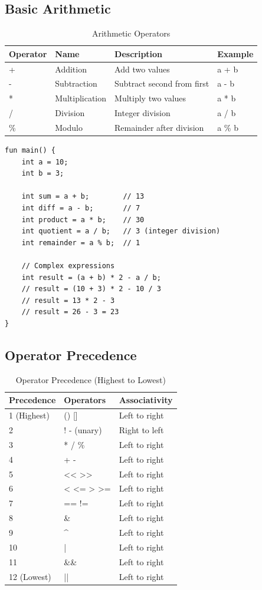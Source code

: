 \documentclass[12pt,a4paper,oneside]{book}
\begin{document}
\subsection{Basic Arithmetic}

\begin{table}[H]
\centering
\caption{Arithmetic Operators}
\begin{tabularx}{\textwidth}{|l|l|X|l|}
\hline
\textbf{Operator} & \textbf{Name} & \textbf{Description} & \textbf{Example} \\
\hline
+ & Addition & Add two values & a + b \\
- & Subtraction & Subtract second from first & a - b \\
* & Multiplication & Multiply two values & a * b \\
/ & Division & Integer division & a / b \\
\% & Modulo & Remainder after division & a \% b \\
\hline
\end{tabularx}
\end{table}

\begin{lstlisting}[style=algo, caption={Arithmetic Examples}]
fun main() {
    int a = 10;
    int b = 3;
    
    int sum = a + b;        // 13
    int diff = a - b;       // 7
    int product = a * b;    // 30
    int quotient = a / b;   // 3 (integer division)
    int remainder = a % b;  // 1
    
    // Complex expressions
    int result = (a + b) * 2 - a / b;
    // result = (10 + 3) * 2 - 10 / 3
    // result = 13 * 2 - 3
    // result = 26 - 3 = 23
}
\end{lstlisting}

\subsection{Operator Precedence}

\begin{table}[H]
\centering
\caption{Operator Precedence (Highest to Lowest)}
\begin{tabular}{|l|l|l|}
\hline
\textbf{Precedence} & \textbf{Operators} & \textbf{Associativity} \\
\hline
1 (Highest) & () [] & Left to right \\
2 & ! - (unary) & Right to left \\
3 & * / \% & Left to right \\
4 & + - & Left to right \\
5 & << >> & Left to right \\
6 & < <= > >= & Left to right \\
7 & == != & Left to right \\
8 & \& & Left to right \\
9 & \^{} & Left to right \\
10 & | & Left to right \\
11 & \&\& & Left to right \\
12 (Lowest) & || & Left to right \\
\hline
\end{tabular}
\end{table}
\end{document}
